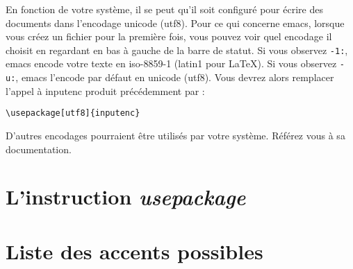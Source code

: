 En fonction de votre système, il se peut qu'il soit configuré pour
écrire des documents dans l'encodage unicode (utf8). Pour ce qui
concerne emacs, lorsque vous créez un fichier pour la première fois,
vous pouvez voir quel encodage il choisit en regardant en bas à gauche
de la barre de statut. Si vous observez \verb?-1:?, emacs encode votre
texte en iso-8859-1 (latin1 pour \LaTeX). Si vous observez \verb?-u:?,
emacs l'encode par défaut en unicode (utf8). Vous devrez alors
remplacer l'appel à inputenc produit précédemment par :
\begin{exemple}[H] %
  \caption{Usage des caractères accentués avec \LaTeX (encodage
    unicode).}
\begin{verbatim}
\usepackage[utf8]{inputenc}
\end{verbatim}
\end{exemple}

D'autres encodages pourraient être utilisés par votre système. Référez
vous à sa documentation.


\section{L'instruction \emph{usepackage}}

\vfill
{}
\vfill

\section{Liste des accents possibles}


